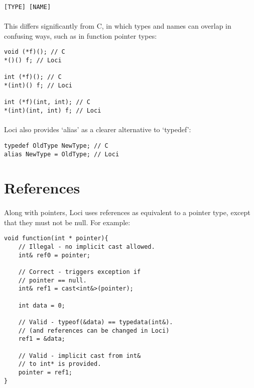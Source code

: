 \documentclass[12pt,twoside,notitlepage]{report}
\begin{document}
\begin{verbatim}
[TYPE] [NAME]
\end{verbatim}

\paragraph{}
This differs significantly from C, in which types and names can overlap in confusing ways, such as in function pointer types:

\begin{verbatim}
void (*f)(); // C
*()() f; // Loci

int (*f)(); // C
*(int)() f; // Loci

int (*f)(int, int); // C
*(int)(int, int) f; // Loci
\end{verbatim}

\paragraph{}
Loci also provides `alias' as a clearer alternative to `typedef':

\begin{verbatim}
typedef OldType NewType; // C
alias NewType = OldType; // Loci
\end{verbatim}

\section{References}

\paragraph{}
Along with pointers, Loci uses references as equivalent to a pointer type, except that they must not be null. For example:

\small{
\begin{verbatim}
void function(int * pointer){
    // Illegal - no implicit cast allowed.
    int& ref0 = pointer;
    
    // Correct - triggers exception if
    // pointer == null.
    int& ref1 = cast<int&>(pointer);
    
    int data = 0;
    
    // Valid - typeof(&data) == typedata(int&).
    // (and references can be changed in Loci)
    ref1 = &data;
    
    // Valid - implicit cast from int&
    // to int* is provided.
    pointer = ref1;
}
\end{verbatim}
}
\end{document}

